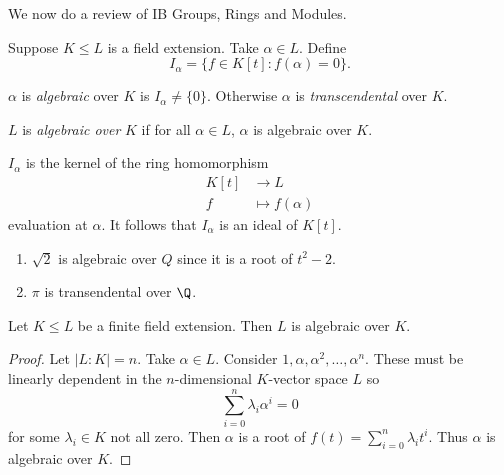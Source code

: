 \documentclass[a4paper]{article}
\begin{document}
We now do a review of IB Groups, Rings and Modules.

Suppose \(K \leq L\) is a field extension. Take \(\alpha \in L\). Define
\[
  I_\alpha = \{f \in K[t]: f(\alpha) = 0\}.
\]

\begin{definition}
  \(\alpha\) is \emph{algebraic} over \(K\) is \(I_\alpha \neq \{0\}\). Otherwise \(\alpha\) is \emph{transcendental} over \(K\).
\end{definition}

\begin{definition}
  \(L\) is \emph{algebraic over} \(K\) if for all \(\alpha \in L\), \(\alpha\) is algebraic over \(K\).
\end{definition}

\begin{remark}
  \(I_\alpha\) is the kernel of the ring homomorphism
  \begin{align*}
    K[t] &\to L \\
    f &\mapsto f(\alpha)
  \end{align*}
  evaluation at \(\alpha\). It follows that \(I_\alpha\) is an ideal of \(K[t]\).
\end{remark}

\begin{eg}\leavevmode
  \begin{enumerate}
  \item \(\sqrt 2\) is algebraic over \(Q\) since it is a root of \(t^2 - 2\).
  \item \(\pi\) is transendental over \(\Q\).
  \end{enumerate}
\end{eg}

\begin{lemma}
  Let \(K \leq L\) be a finite field extension. Then \(L\) is algebraic over \(K\).
\end{lemma}

\begin{proof}
  Let \(|L:K| = n\). Take \(\alpha \in L\). Consider \(1, \alpha, \alpha^2, \dots, \alpha^n\). These must be linearly dependent in the \(n\)-dimensional \(K\)-vector space \(L\) so
  \[
    \sum_{i = 0}^n \lambda_i\alpha^i = 0
  \]
  for some \(\lambda_i \in K\) not all zero. Then \(\alpha\) is a root of \(f(t) = \sum_{i = 0}^n \lambda_it^i\). Thus \(\alpha\) is algebraic over \(K.\)
\end{proof}
\end{document}
